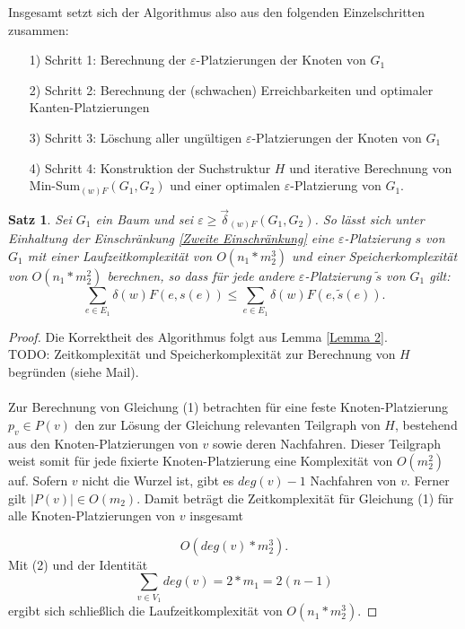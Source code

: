 \documentclass[a4paper, 12pt, twoside]{article}
\theoremstyle{Format1} %
\newtheorem{Satz}[Def]{Satz}                %
\begin{document}
Insgesamt setzt sich der Algorithmus also aus den folgenden Einzelschritten zusammen:
\begin{enumerate}
	\item[1)] Schritt 1: Berechnung der $\varepsilon$-Platzierungen der Knoten von $G_1$
	\item[2)] Schritt 2: Berechnung der (schwachen) Erreichbarkeiten und optimaler Kanten-Platzierungen
	\item[3)] Schritt 3: Löschung aller ungültigen $\varepsilon$-Platzierungen der Knoten von $G_1$
	\item[4)] Schritt 4: Konstruktion der Suchstruktur $H$ und iterative Berechnung von Min-Sum$_{(w)F}(G_1, G_2)$ und einer optimalen $\varepsilon$-Platzierung von $G_1$.
\end{enumerate}

\begin{Satz}
	Sei $G_1$ ein Baum und sei $\varepsilon \geq \vec{\delta}_{(w)F}(G_1,G_2)$.
	So lässt sich unter Einhaltung der Einschränkung \ref{Zweite Einschränkung} eine $\varepsilon$-Platzierung $s$ von $G_1$
	mit einer Laufzeitkomplexität von $O(n_1*m_2^3)$ und einer Speicherkomplexität von $O(n_1*m_2^2)$ berechnen, so dass für jede
	andere $\varepsilon$-Platzierung $\tilde{s}$ von $G_1$ gilt:
	$$\sum_{e \in E_1}\delta{(w)F}(e, s(e)) \leq \sum_{e \in E_1}\delta{(w)F}(e, \tilde{s}(e)).$$
\end{Satz}

\begin{proof}
Die Korrektheit des Algorithmus folgt aus Lemma \ref{Lemma 2}.
\\
TODO: Zeitkomplexität und Speicherkomplexität zur Berechnung von $H$ begründen (siehe Mail).
\\
\\
Zur Berechnung von Gleichung (1) betrachten für eine feste Knoten-Platzierung $p_v \in P(v)$ den zur Lösung der Gleichung relevanten Teilgraph von $H$,
bestehend aus den Knoten-Platzierungen von $v$ sowie deren Nachfahren. Dieser Teilgraph weist somit für jede fixierte Knoten-Platzierung eine Komplexität von $O(m_2^2)$ auf.
Sofern $v$ nicht die Wurzel ist, gibt es $deg(v)-1$ Nachfahren von $v$. Ferner gilt $|P(v)| \in O(m_2)$. Damit beträgt die Zeitkomplexität für Gleichung (1) für alle
Knoten-Platzierungen von $v$ insgesamt

\begin{equation}
	O(deg(v)*m_2^3).
\end{equation}
Mit (2) und der Identität
\begin{equation}
	\sum_{v \in V_1} deg(v) = 2*m_1 = 2(n-1)
\end{equation}
ergibt sich schließlich die Laufzeitkomplexität von $O(n_1*m_2^3).$
\end{proof}
\newpage
\end{document}

